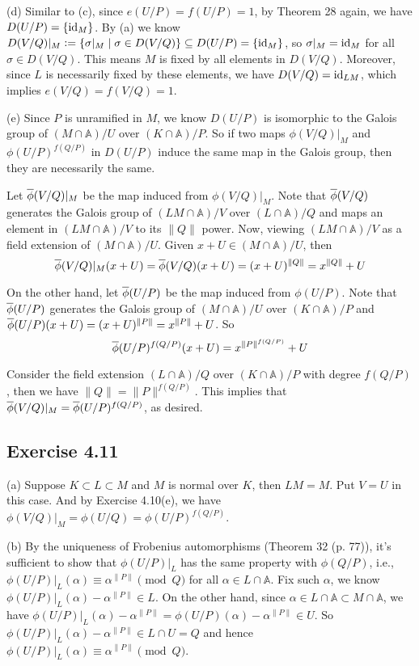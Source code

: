 \documentclass[../Marcus.tex]{subfiles}
\begin{document}
(d) Similar to (c), since $e(U/P)=f(U/P)=1$, by Theorem 28 again, we have $D(U/P)=\{\operatorname{id}_M\}$. By (a) we know $D(V/Q)|_M:=\{\sigma|_M \mid \sigma\in D(V/Q)\} \subseteq D(U/P)=\{\operatorname{id}_M\}$, so $\sigma|_M=\operatorname{id}_M$ for all $\sigma\in D(V/Q)$. This means $M$ is fixed by all elements in $D(V/Q)$. Moreover, since $L$ is necessarily fixed by these elements, we have $D(V/Q)=\operatorname{id}_{LM}$, which implies $e(V/Q)=f(V/Q)=1$.

(e) Since $P$ is unramified in $M$, we know $D(U/P)$ is isomorphic to the Galois group of $(M\cap\mathbb{A})/U$ over $(K\cap\mathbb{A})/P$. So if two maps $\phi(V/Q)|_M$ and $\phi(U/P)^{f(Q/P)}$ in $D(U/P)$ induce the same map in the Galois group, then they are necessarily the same. 

Let $\overline{\phi}(V/Q)|_M$ be the map induced from $\phi(V/Q)|_M$. Note that $\overline{\phi}(V/Q)$ generates the Galois group of $(LM\cap\mathbb{A})/V$ over $(L\cap\mathbb{A})/Q$ and maps an element in $(LM\cap\mathbb{A})/V$ to its $\|Q\|$ power. Now, viewing $(LM\cap\mathbb{A})/V$ as a field extension of $(M\cap\mathbb{A})/U$. Given $x+U\in(M\cap\mathbb{A})/U$, then $$\overline{\phi}(V/Q)|_M(x+U)=\overline{\phi}(V/Q)(x+U)=(x+U)^{\|Q\|}=x^{\|Q\|}+U$$

On the other hand, let $\overline{\phi}(U/P)$ be the map induced from $\phi(U/P)$. Note that $\overline{\phi}(U/P)$ generates the Galois group of $(M\cap\mathbb{A})/U$ over $(K\cap\mathbb{A})/P$ and $\overline{\phi}(U/P)(x+U)=(x+U)^{\|P\|}=x^{\|P\|}+U$. So $$\overline{\phi}(U/P)^{f(Q/P)}(x+U)=x^{\|P\|^{f(Q/P)}}+U$$

Consider the field extension $(L\cap\mathbb{A})/Q$ over $(K\cap\mathbb{A})/P$ with degree $f(Q/P)$, then we have $\|Q\|=\|P\|^{f(Q/P)}$. This implies that $\overline{\phi}(V/Q)|_M=\overline{\phi}(U/P)^{f(Q/P)}$, as desired.

\subsection*{Exercise 4.11}

(a) Suppose $K\subset L\subset M$ and $M$ is normal over $K$, then $LM=M$. Put $V=U$ in this case. And by Exercise 4.10(e), we have $\phi(V/Q)|_M=\phi(U/Q)=\phi(U/P)^{f(Q/P)}$.

(b) By the uniqueness of Frobenius automorphisms (Theorem 32 (p. 77)), it's sufficient to show that $\phi(U/P)|_L$ has the same property with $\phi(Q/P)$, i.e., $\phi(U/P)|_L(\alpha)\equiv\alpha^{\|P\|} \pmod{Q}$ for all $\alpha\in L\cap\mathbb{A}$. Fix such $\alpha$, we know $\phi(U/P)|_L(\alpha)-\alpha^{\|P\|}\in L$. On the other hand, since $\alpha\in L\cap\mathbb{A}\subset M\cap\mathbb{A}$, we have $\phi(U/P)|_L(\alpha)-\alpha^{\|P\|}=\phi(U/P)(\alpha)-\alpha^{\|P\|}\in U$. So $\phi(U/P)|_L(\alpha)-\alpha^{\|P\|} \in L\cap U=Q$ and hence $\phi(U/P)|_L(\alpha)\equiv\alpha^{\|P\|} \pmod{Q}$.
\end{document}

